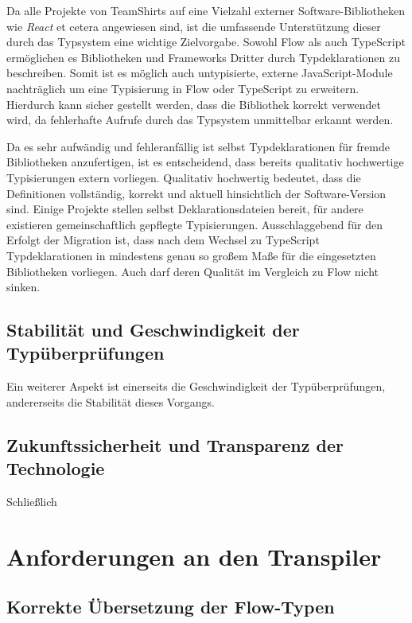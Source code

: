 Da alle Projekte von TeamShirts auf eine Vielzahl externer Software-Bibliotheken wie \textit{React} et cetera angewiesen sind, ist die umfassende Unterstützung dieser durch das Typsystem eine wichtige Zielvorgabe. Sowohl Flow als auch TypeScript ermöglichen es Bibliotheken und Frameworks Dritter durch Typdeklarationen zu beschreiben. Somit ist es möglich auch untypisierte, externe JavaScript-Module nachträglich um eine Typisierung in Flow oder TypeScript zu erweitern. Hierdurch kann sicher gestellt werden, dass die Bibliothek korrekt verwendet wird, da fehlerhafte Aufrufe durch das Typsystem unmittelbar erkannt werden.

Da es sehr aufwändig und fehleranfällig ist selbst Typdeklarationen für fremde Bibliotheken anzufertigen, ist es entscheidend, dass bereits qualitativ hochwertige Typisierungen extern vorliegen. Qualitativ hochwertig bedeutet, dass die Definitionen vollständig, korrekt und aktuell hinsichtlich der Software-Version sind. Einige Projekte stellen selbst Deklarationsdateien bereit, für andere existieren gemeinschaftlich gepflegte Typisierungen. Ausschlaggebend für den Erfolgt der Migration ist, dass nach dem Wechsel zu TypeScript Typdeklarationen in mindestens genau so großem Maße für die eingesetzten Bibliotheken vorliegen. Auch darf deren Qualität im Vergleich zu Flow nicht sinken.

\subsection{Stabilität und Geschwindigkeit der Typüberprüfungen}

Ein weiterer Aspekt ist einerseits die Geschwindigkeit der Typüberprüfungen, andererseits die Stabilität dieses Vorgangs.

\subsection{Zukunftssicherheit und Transparenz der Technologie}

Schließlich

\section{Anforderungen an den Transpiler}

\subsection{Korrekte Übersetzung der Flow-Typen}
\label{subsection:requirement:correct-translation}

